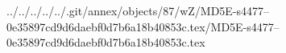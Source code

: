 ../../../../../.git/annex/objects/87/wZ/MD5E-s4477--0e35897cd9d6daebf0d7b6a18b40853c.tex/MD5E-s4477--0e35897cd9d6daebf0d7b6a18b40853c.tex